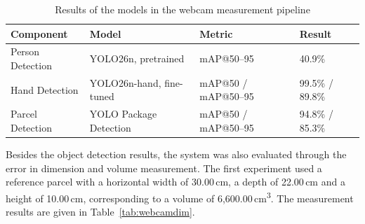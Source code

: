 \begin{table}[htbp]
\centering
\caption{Results of the models in the webcam measurement pipeline}
\label{tab:webcammodelres}
\small
\begin{tabular}{llll}
\hline
\textbf{Component} & \textbf{Model} & \textbf{Metric} & \textbf{Result} \\
\hline
Person Detection & YOLO26n, pretrained & mAP@50--95 & 40.9\% \\
Hand Detection & YOLO26n-hand, fine-tuned & mAP@50 / mAP@50--95 & 99.5\% / 89.8\% \\
Parcel Detection & YOLO Package Detection & mAP@50 / mAP@50--95 & 94.8\% / 85.3\% \\
\hline
\end{tabular}
\end{table}

Besides the object detection results, the system was also evaluated through the error in dimension and volume measurement. The first experiment used a reference parcel with a horizontal width of 30.00\,cm, a depth of 22.00\,cm and a height of 10.00\,cm, corresponding to a volume of 6,600.00\,cm\textsuperscript{3}. The measurement results are given in Table~\ref{tab:webcamdim}.

